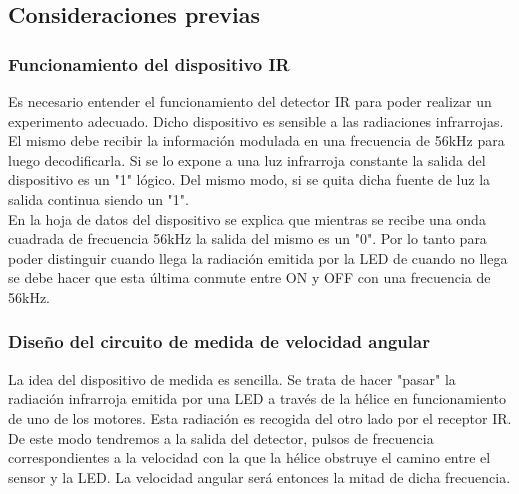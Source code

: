 \documentclass[spanish,12pt,a4paper,titlepage]{report}
\begin{document}
\subsection{Consideraciones previas}
\subsubsection*{Funcionamiento del dispositivo IR}
Es necesario entender el funcionamiento del detector IR para poder realizar un experimento adecuado. Dicho dispositivo es sensible a las radiaciones infrarrojas. El mismo debe recibir la información modulada en una frecuencia de 56kHz para luego decodificarla. Si se lo expone a una luz infrarroja constante la salida del dispositivo es un "1" lógico. Del mismo modo, si se quita dicha fuente de luz la salida continua siendo un "1". \\

En la hoja de datos del dispositivo se explica que mientras se recibe una onda cuadrada de frecuencia 56kHz la salida del mismo es un "0". Por lo tanto para poder distinguir cuando llega la radiación emitida por la LED de cuando no llega se debe hacer que esta última conmute entre ON y OFF con una frecuencia de 56kHz.

\subsubsection*{Diseño del circuito de medida de velocidad angular}

La idea del dispositivo de medida es sencilla. Se trata de hacer "pasar" la radiación infrarroja emitida por una LED a través de la hélice en funcionamiento de uno de los motores. Esta radiación es recogida del otro lado por el receptor IR.\\

De este modo tendremos a la salida del detector, pulsos de frecuencia correspondientes a la velocidad con la que la hélice obstruye el camino entre el sensor y la LED. La velocidad angular será entonces la mitad de dicha frecuencia.\\ 
\end{document}
